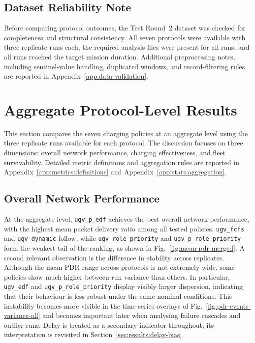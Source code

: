 \subsection{Dataset Reliability Note}
\label{sec:results:data-reliability}

Before comparing protocol outcomes, the Test Round~2 dataset was checked for
completeness and structural consistency. All seven protocols were available with
three replicate runs each, the required analysis files were present for all runs, and
all runs reached the target mission duration. Additional preprocessing notes,
including sentinel-value handling, duplicated windows, and record-filtering rules, are
reported in Appendix~\ref{app:data-validation}.

\section{Aggregate Protocol-Level Results}
\label{sec:results:aggregate}

This section compares the seven charging policies at an aggregate level using the
three replicate runs available for each protocol. The discussion focuses on three
dimensions: overall network performance, charging effectiveness, and fleet
survivability. Detailed metric definitions and aggregation rules are reported in
Appendix~\ref{app:metrics:definitions} and Appendix~\ref{app:stats:aggregation}.

\subsection{Overall Network Performance}
\label{sec:results:network-kpis}

At the aggregate level, \texttt{ugv\_p\_edf} achieves the best overall network
performance, with the highest mean packet delivery ratio among all tested policies.
\texttt{ugv\_fcfs} and \texttt{ugv\_dynamic} follow, while
\texttt{ugv\_role\_priority} and \texttt{ugv\_p\_role\_priority} form the weakest
tail of the ranking, as shown in Fig.~\ref{fig:mean-pdr-merged}.
A second relevant observation is the difference in stability across replicates.
Although the mean PDR range across protocols is not extremely wide, some
policies show much higher between-run variance than others. In particular,
\texttt{ugv\_edf} and \texttt{ugv\_p\_role\_priority} display visibly larger
dispersion, indicating that their behaviour is less robust under the same nominal
conditions. This instability becomes more visible in the time-series overlays of
Fig.~\ref{fig:pdr-events-variance-all} and becomes important later when analysing
failure cascades and outlier runs.
Delay is treated as a secondary indicator throughout; its interpretation is revisited in
Section~\ref{sec:results:delay-bias}.

